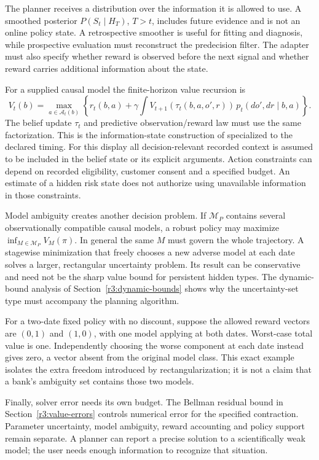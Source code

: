 The planner receives a distribution over the information it is allowed
to use. A smoothed posterior $P(S_t\mid H_T)$, $T>t$, includes future
evidence and is not an online policy state. A retrospective smoother is
useful for fitting and diagnosis, while prospective evaluation must
reconstruct the predecision filter. The adapter must also specify whether
reward is observed before the next signal and whether reward carries
additional information about the state.

For a supplied causal model the finite-horizon value recursion is
\[
 V_t(b)=\max_{a\in\mathcal A_t(b)}
 \left\{r_t(b,a)+
 \gamma\int V_{t+1}(\tau_t(b,a,o',r))\,
                 p_t(do',dr\mid b,a)\right\}.
\]
The belief update $\tau_t$ and predictive observation/reward law must
use the same factorization. This is the information-state construction
of \citet{kaelbling1998} specialized to the declared timing.
For this display all decision-relevant recorded context is assumed to
be included in the belief state or its explicit arguments. Action
constraints can depend on recorded eligibility, customer consent
and a specified budget. An estimate of a hidden risk state does not
authorize using unavailable information in those constraints.

Model ambiguity creates another decision problem. If $\mathcal M_P$
contains several observationally compatible causal models, a robust
policy may maximize $\inf_{M\in\mathcal M_P}V_M(\pi)$. In general the
same $M$ must govern the whole trajectory. A stagewise minimization
that freely chooses a new adverse model at each date solves a larger,
rectangular uncertainty problem. Its result can be conservative and
need not be the sharp value bound for persistent hidden types. The
dynamic-bound analysis of Section~\ref{r3:dynamic-bounds} shows why
the uncertainty-set type must accompany the planning algorithm.

For a two-date fixed policy with no discount, suppose the allowed
reward vectors are $(0,1)$ and $(1,0)$, with one model applying at
both dates. Worst-case total value is one. Independently choosing
the worse component at each date instead gives zero, a vector absent
from the original model class. This exact example isolates the extra
freedom introduced by rectangularization; it is not a claim that a
bank's ambiguity set contains those two models.

Finally, solver error needs its own budget. The Bellman residual bound
in Section~\ref{r3:value-errors} controls numerical error for the
specified contraction. Parameter uncertainty, model ambiguity, reward
accounting and policy support remain separate. A planner can report
a precise solution to a scientifically weak model; the user needs
enough information to recognize that situation.

